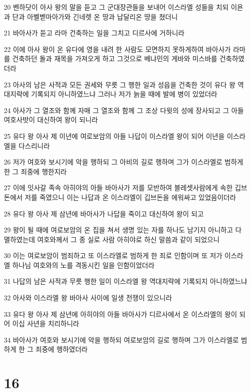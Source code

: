 \par 20 벤하닷이 아사 왕의 말을 듣고 그 군대장관들을 보내어 이스라엘 성들을 치되 이욘과 단과 아벨벧마아가와 긴네렛 온 땅과 납달리온 땅을 쳤더니
\par 21 바아사가 듣고 라마 건축하는 일을 그치고 디르사에 거하니라
\par 22 이에 아사 왕이 온 유다에 영을 내려 한 사람도 모면하지 못하게하여 바아사가 라마를 건축하던 돌과 재목을 가져오게 하고 그것으로 베냐민의 게바와 미스바를 건축하였더라
\par 23 아사의 남은 사적과 모든 권세와 무릇 그 행한 일과 성읍을 건축한 것이 유다 왕 역대지략에 기록되지 아니하였느냐 그러나 저가 늙을 때에 발에 병이 있었더라
\par 24 아사가 그 열조와 함께 자매 그 열조와 함께 그 조상 다윗의 성에 장사되고 그 아들 여호사밧이 대신하여 왕이 되니라
\par 25 유다 왕 아사 제 이년에 여로보암의 아들 나답이 이스라엘 왕이 되어 이년을 이스라엘을 다스리니라
\par 26 저가 여호와 보시기에 악을 행하되 그 아비의 길로 행하며 그가 이스라엘로 범하게 한 그 죄중에 행한지라
\par 27 이에 잇사갈 족속 아히야의 아들 바아사가 저를 모반하여 블레셋사람에게 속한 깁브돈에서 저를 죽였으니 이는 나답과 온 이스라엘이 깁브돈을 에워싸고 있었음이더라
\par 28 유다 왕 아사 제 삼년에 바아사가 나답을 죽이고 대신하여 왕이 되고
\par 29 왕이 될 때에 여로보암의 온 집을 쳐서 생명 있는 자를 하나도 남기지 아니하고 다 멸하였는데 여호와께서 그 종 실로 사람 아히야로 하신 말씀과 같이 되었으니
\par 30 이는 여로보암이 범죄하고 또 이스라엘로 범하게 한 죄로 인함이며 또 저가 이스라엘 하나님 여호와의 노를 격동시킨 일을 인함이었더라
\par 31 나답의 남은 사적과 무릇 행한 일이 이스라엘 왕 역대지략에 기록되지 아니하였느냐
\par 32 아사와 이스라엘 왕 바아사 사이에 일생 전쟁이 있으니라
\par 33 유다 왕 아사 제 삼년에 아히야의 아들 바아사가 디르사에서 온 이스라엘의 왕이 되어 이십 사년을 치리하니라
\par 34 바아사가 여호와 보시기에 악을 행하되 여로보암의 길로 행하며 그가 이스라엘로 범하게 한 그 죄중에 행하였더라

\chapter{16}

